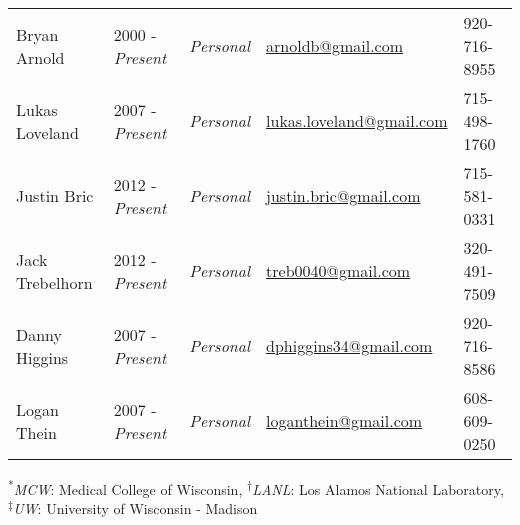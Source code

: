 \begin{center}
\begin{minipage}{\textwidth}
\begin{tabular}{p{3.2cm}p{2.2cm}p{3.7cm}p{5.0cm}p{2.4cm}}

Bryan Arnold & 2000 - \emph{Present} & \textit{Personal} &  \href{mailto:arnoldb@gmail.com}{arnoldb@gmail.com} &   920-716-8955 \\
Lukas Loveland & 2007 - \emph{Present} & \textit{Personal} &  \href{mailto:lukas.loveland@gmail.com}{lukas.loveland@gmail.com} &   715-498-1760\\ 
Justin Bric & 2012 - \emph{Present}& \textit{Personal} & \href{mailto:justin.bric@gmail.com}{justin.bric@gmail.com} &  715-581-0331 \\ 
Jack Trebelhorn & 2012 - \emph{Present} & \textit{Personal} & \href{mailto:treb0040@gmail.com}{treb0040@gmail.com} &   320-491-7509 \\
Danny Higgins & 2007 - \emph{Present} & \textit{Personal} & \href{mailto:dphiggins34@gmail.com}{dphiggins34@gmail.com} & 920-716-8586 \\
Logan Thein & 2007 - \emph{Present} & \textit{Personal} & \href{mailto:loganthein@gmail.com}{loganthein@gmail.com}  &   608-609-0250  \\

\end{tabular}
\end{minipage}
\end{center}

\begin{center}
\begin{minipage}{\textwidth}
\footnotesize
\centering
\textsuperscript{*}\textit{MCW}: Medical College of Wisconsin, \textsuperscript{$\dagger$}\textit{LANL}: Los Alamos National Laboratory, \textsuperscript{$\ddagger$}\textit{UW}: University of Wisconsin - Madison \\
\end{minipage}
\end{center}

